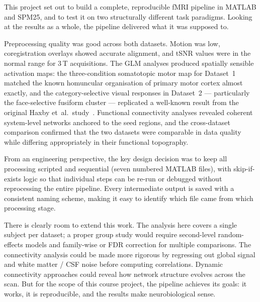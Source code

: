 This project set out to build a complete, reproducible fMRI pipeline
in MATLAB and SPM25, and to test it on two structurally different
task paradigms. Looking at the results as a whole, the pipeline
delivered what it was supposed to.

Preprocessing quality was good across both datasets. Motion was low,
coregistration overlays showed accurate alignment, and tSNR values
were in the normal range for 3\,T acquisitions. The GLM analyses
produced spatially sensible activation maps: the three-condition
somatotopic motor map for Dataset~1 matched the known homuncular
organisation of primary motor cortex almost exactly, and the
category-selective visual responses in Dataset~2 — particularly the
face-selective fusiform cluster — replicated a well-known result from
the original Haxby et~al.\ study~\cite{Haxby2001}. Functional
connectivity analyses revealed coherent system-level networks anchored
to the seed regions, and the cross-dataset comparison confirmed that
the two datasets were comparable in data quality while differing
appropriately in their functional topography.

From an engineering perspective, the key design decision was to keep
all processing scripted and sequential (seven numbered MATLAB files),
with skip-if-exists logic so that individual steps can be re-run or
debugged without reprocessing the entire pipeline. Every intermediate
output is saved with a consistent naming scheme, making it easy to
identify which file came from which processing stage.

There is clearly room to extend this work. The analysis here covers
a single subject per dataset; a proper group study would require
second-level random-effects models and family-wise or FDR correction
for multiple comparisons. The connectivity analysis could be made
more rigorous by regressing out global signal and white matter / CSF
noise before computing correlations. Dynamic connectivity approaches
could reveal how network structure evolves across the scan. But for
the scope of this course project, the pipeline achieves its goals:
it works, it is reproducible, and the results make neurobiological
sense.
